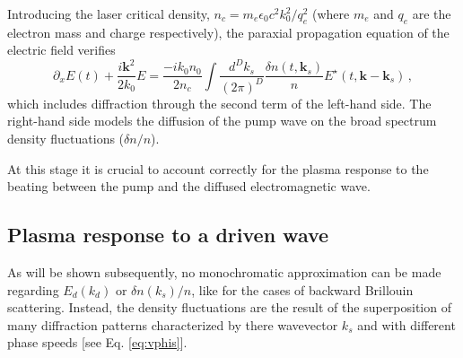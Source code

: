 \documentclass[
 reprint,
 amsmath,amssymb,
 aps,
]{revtex4-1}
\begin{document}
Introducing the laser critical density, $n_c = m_e \epsilon_0c^2 k_0^2/q_e^2 $ (where  $m_e$ and  $q_e$ are the  electron mass and charge respectively), the  paraxial propagation equation of the electric field verifies \cite[]{POP_Grech_2006}
\begin{equation}
    \partial_x E(t) +\frac{i\mathbf{k}^2}{2k_0}E=\frac{-ik_0n_0}{2n_c} \int \frac{d^Dk_s}{(2\pi)^D} \frac{\delta n(t,\mathbf{k}_s)}{n} E^\star(t,\mathbf{k}-\mathbf{k}_s) \, ,\label{eq:parax}
\end{equation}
which includes diffraction through the second term of the left-hand side.  
The right-hand side models the  diffusion  of the pump wave  on the broad spectrum density fluctuations ($\delta n/n$).

At this stage it is crucial to  account correctly for the plasma response to the beating between  the pump and the diffused electromagnetic wave. 

\subsection{Plasma response to a driven wave}
\label{sec:drake}
As will be shown subsequently, no monochromatic approximation can be made regarding $E_d(k_d)$ or $\delta n(k_s)/n$, like for the cases of backward Brillouin scattering. Instead, the density fluctuations are the  result of the superposition of many diffraction patterns characterized by there wavevector $k_s$ and with different  phase speeds [see Eq. \eqref{eq:vphis}].
\end{document}
